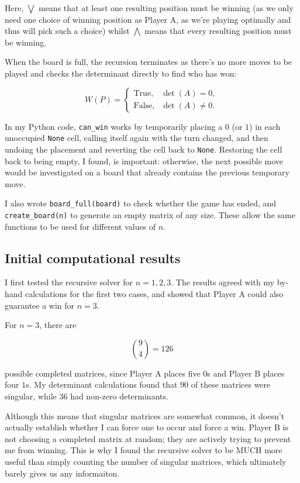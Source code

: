 \documentclass[11pt]{article}
\newcommand{\keywordfont}{\textsc}
\newcommand{\keyword}[1]{%
  \marginpar{\raggedright\small\keywordfont{#1}}}
\begin{document}
Here, $\bigvee$ means that at least one resulting position must be winning (as we only need one choice of winning position as Player A, as we're playing optimally and thus will pick such a choice) whilst $\bigwedge$ means that every resulting position must be winning.

When the board is full, the recursion terminates as there's no more moves to be played and checks the determinant directly to find who has won:

$$
W(P)=
\begin{cases}
\text{True},&\det(A)=0,\\
\text{False},&\det(A)\neq 0.
\end{cases}
$$

In my Python code, \texttt{can\_win} works by temporarily placing a $0$ (or $1$) in each unoccupied \texttt{None} cell, calling itself again with the turn changed, and then undoing the placement and reverting the cell back to \texttt{None}. Restoring the cell back to being empty, I found, is important: otherwise, the next possible move would be investigated on a board that already contains the previous temporary move.

I also wrote \texttt{board\_full(board)} to check whether the game has ended, and \texttt{create\_board(n)} to generate an empty matrix of any size. These allow the same functions to be used for different values of $n$.

\subsection*{Initial computational results}

I first tested the recursive solver for $n=1,2,3$. The results agreed with my by-hand calculations for the first two cases, and showed that Player A could also guarantee a win for $n=3$.

For $n=3$, there are

$$
\binom{9}{4}=126
$$

possible completed matrices, since Player A places five $0$s and Player B places four $1$s. My determinant calculations found that 90 of these matrices were singular, while 36 had non-zero determinants.

\keyword{PAUSE} Although this means that singular matrices are somewhat common, it doesn't actually establish whether I can force one to occur and force a win. Player B is not choosing a completed matrix at random; they are actively trying to prevent me from winning. This is why I found the recursive solver to be MUCH more useful than simply counting the number of singular matrices, which ultimately barely gives us any informaiton.
\end{document}
